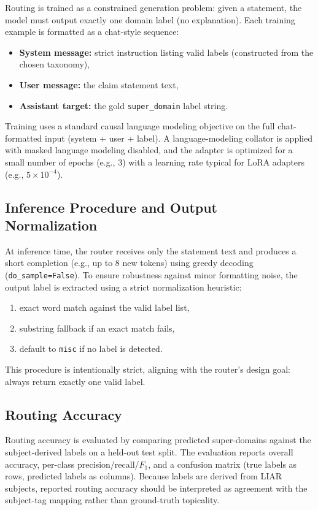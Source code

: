 Routing is trained as a constrained generation problem: given a statement, the model must output exactly one domain label (no explanation). Each training example is formatted as a chat-style sequence:
\begin{itemize}
    \item \textbf{System message:} strict instruction listing valid labels (constructed from the chosen taxonomy),
    \item \textbf{User message:} the claim statement text,
    \item \textbf{Assistant target:} the gold \texttt{super\_domain} label string.
\end{itemize}
Training uses a standard causal language modeling objective on the full chat-formatted input (system + user + label). A language-modeling collator is applied with masked language modeling disabled, and the adapter is optimized for a small number of epochs (e.g., 3) with a learning rate typical for LoRA adapters (e.g., $5\times10^{-4}$).

\subsection{Inference Procedure and Output Normalization}

At inference time, the router receives only the statement text and produces a short completion (e.g., up to 8 new tokens) using greedy decoding (\texttt{do\_sample=False}). To ensure robustness against minor formatting noise, the output label is extracted using a strict normalization heuristic:
\begin{enumerate}
    \item exact word match against the valid label list,
    \item substring fallback if an exact match fails,
    \item default to \texttt{misc} if no label is detected.
\end{enumerate}
This procedure is intentionally strict, aligning with the router's design goal: always return exactly one valid label.

\subsection{Routing Accuracy}

Routing accuracy is evaluated by comparing predicted super-domains against the subject-derived labels on a held-out test split. The evaluation reports overall accuracy, per-class precision/recall/$F_1$, and a confusion matrix (true labels as rows, predicted labels as columns). Because labels are derived from LIAR subjects, reported routing accuracy should be interpreted as agreement with the subject-tag mapping rather than ground-truth topicality.

